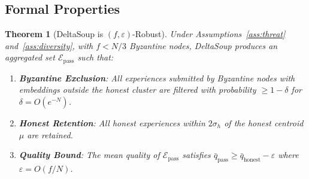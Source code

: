 \documentclass[11pt]{article}
\newtheorem{theorem}{Theorem}
\begin{document}
\subsection{Formal Properties}

\begin{theorem}[DeltaSoup is $(f, \varepsilon)$-Robust]
\label{thm:deltasoup-robust}
Under Assumptions~\ref{ass:threat} and~\ref{ass:diversity}, with $f < N/3$
Byzantine nodes, DeltaSoup produces an aggregated set $\mathcal{E}_{\text{pass}}$
such that:
\begin{enumerate}[leftmargin=1.5em]
    \item \textbf{Byzantine Exclusion}: All experiences submitted by Byzantine
          nodes with embeddings outside the honest cluster are filtered with
          probability $\geq 1 - \delta$ for $\delta = O(e^{-N})$.
    \item \textbf{Honest Retention}: All honest experiences within $2\sigma_h$
          of the honest centroid $\mu$ are retained.
    \item \textbf{Quality Bound}: The mean quality of $\mathcal{E}_{\text{pass}}$
          satisfies $\bar{q}_{\text{pass}} \geq \bar{q}_{\text{honest}} - \varepsilon$
          where $\varepsilon = O(f/N)$.
\end{enumerate}
\end{theorem}
\end{document}
